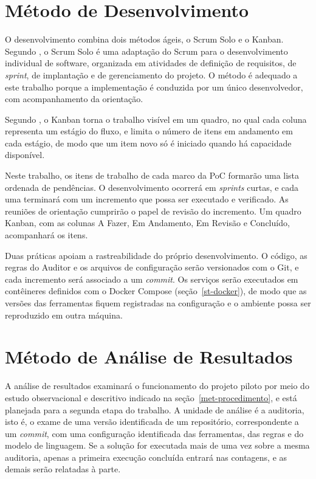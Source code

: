 \section{Método de Desenvolvimento}
\label{met-desenvolvimento}

O desenvolvimento combina dois métodos ágeis, o Scrum Solo e o Kanban. Segundo , o Scrum Solo é uma adaptação do Scrum para o desenvolvimento individual de software, organizada em atividades de definição de requisitos, de \textit{sprint}, de implantação e de gerenciamento do projeto. O método é adequado a este trabalho porque a implementação é conduzida por um único desenvolvedor, com acompanhamento da orientação.

Segundo , o Kanban torna o trabalho visível em um quadro, no qual cada coluna representa um estágio do fluxo, e limita o número de itens em andamento em cada estágio, de modo que um item novo só é iniciado quando há capacidade disponível.

Neste trabalho, os itens de trabalho de cada marco da PoC formarão uma lista ordenada de pendências. O desenvolvimento ocorrerá em \textit{sprints} curtas, e cada uma terminará com um incremento que possa ser executado e verificado. As reuniões de orientação cumprirão o papel de revisão do incremento. Um quadro Kanban, com as colunas A Fazer, Em Andamento, Em Revisão e Concluído, acompanhará os itens.

Duas práticas apoiam a rastreabilidade do próprio desenvolvimento. O código, as regras do Auditor e os arquivos de configuração serão versionados com o Git, e cada incremento será associado a um \textit{commit}. Os serviços serão executados em contêineres definidos com o Docker Compose (seção~\ref{st-docker}), de modo que as versões das ferramentas fiquem registradas na configuração e o ambiente possa ser reproduzido em outra máquina.

\section{Método de Análise de Resultados}
\label{met-analise}

A análise de resultados examinará o funcionamento do projeto piloto por meio do estudo observacional e descritivo indicado na seção~\ref{met-procedimento}, e está planejada para a segunda etapa do trabalho. A unidade de análise é a auditoria, isto é, o exame de uma versão identificada de um repositório, correspondente a um \textit{commit}, com uma configuração identificada das ferramentas, das regras e do modelo de linguagem. Se a solução for executada mais de uma vez sobre a mesma auditoria, apenas a primeira execução concluída entrará nas contagens, e as demais serão relatadas à parte.

